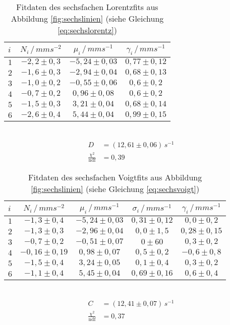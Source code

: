 \begin{table}[h!]
	\centering
	\begin{tabular}{l|ccc}
		$i$&$N_i\,/\,\si{mms^{-2}}$&$\mu_i\,/\,\si{mms^{-1}}$&$\gamma_i\,/\,\si{mms^{-1}}$\\\hline
		$1$&$-2,2\pm0,3$&$-5,24\pm0,03$&$0,77\pm0,12$\\
		$2$&$-1,6\pm0,3$&$-2,94\pm0,04$&$0,68\pm0,13$\\
		$3$&$-1,0\pm0,2$&$-0,55\pm0,06$&$0,6 \pm0,2$\\
		$4$&$-0,7\pm0,2$&$ 0,96\pm0,08$&$0,6 \pm0,2$\\
		$5$&$-1,5\pm0,3$&$ 3,21\pm0,04$&$0,68\pm0,14$\\
		$6$&$-2,6\pm0,4$&$ 5,44\pm0,04$&$0,99\pm0,15$\\
	\end{tabular}\\
	\begin{align*}
	D&=(12,61\pm0,06)\,\si{s^{-1}}\\
	\frac{\chi^2}{\mathrm{ndf}}&=0,39
	\end{align*}
	\caption[Fitdaten des sechsfachen Lorentzfits]{Fitdaten des sechsfachen Lorentzfits aus Abbildung \ref{fig:sechslinien} (siehe Gleichung \ref{eq:sechslorentz})}
	\label{tab:sechslorentz}
\end{table}

\begin{table}[h!]
	\centering
	\begin{tabular}{l|cccc}
		$i$&$N_i\,/\,\si{mms^{-2}}$&$\mu_i\,/\,\si{mms^{-1}}$&$\sigma_i\,/\,\si{mms^{-1}}$&$\gamma_i\,/\,\si{mms^{-1}}$\\\hline
		$1$&$-1,3\pm0,4$&$-5,24\pm0,03$&$0,31 \pm0,12$&$0,0 \pm0,2$\\
		$2$&$-1,3\pm0,3$&$-2,96\pm0,04$&$0,0  \pm1,5$ &$0,28\pm0,15$\\
		$3$&$-0,7\pm0,2$&$-0,51\pm0,07$&$0    \pm60$  &$0,3 \pm0,2$\\
		$4$&$-0,16\pm0,19$&$ 0,98\pm0,07$&$0,5\pm0,2$ &$-0,6\pm0,8$\\
		$5$&$-1,5\pm0,4$&$ 3,24\pm0,05$&$0,1  \pm0,4$ &$0,3 \pm0,2$\\
		$6$&$-1,1\pm0,4$&$ 5,45\pm0,04$&$0,69 \pm0,16$&$0,6\pm0,4$\\
	\end{tabular}\\
	\begin{align*}
		C&=(12,41\pm0,07)\,\si{s^{-1}}\\
		\frac{\chi^2}{\mathrm{ndf}}&=0,37
	\end{align*}
	\caption[Fitdaten des sechsfachen Voigtfits]{Fitdaten des sechsfachen Voigtfits aus Abbildung \ref{fig:sechslinien} (siehe Gleichung \ref{eq:sechsvoigt})}
	\label{tab:sechsvoigt}
\end{table}
\clearpage
